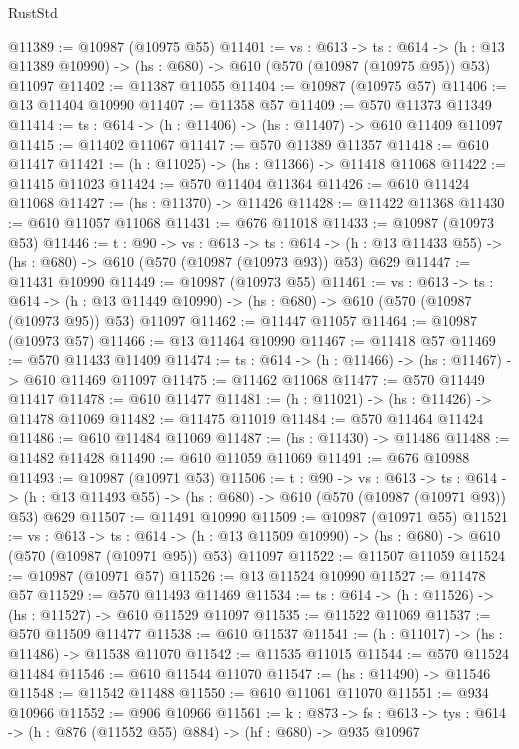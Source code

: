 \begin{lexlean}{RustStd}
\begin{coremodule}
@11389 := @10987 (@10975 @55)
@11401 := {vs : @613} ->
  {ts : @614} ->
  (h : @13 @11389 @10990) -> (hs : @680) -> @610 (@570 (@10987 (@10975 @95)) @53) @11097
@11402 := @11387 @11055
@11404 := @10987 (@10975 @57)
@11406 := @13 @11404 @10990
@11407 := @11358 @57
@11409 := @570 @11373 @11349
@11414 := {ts : @614} -> (h : @11406) -> (hs : @11407) -> @610 @11409 @11097
@11415 := @11402 @11067
@11417 := @570 @11389 @11357
@11418 := @610 @11417
@11421 := (h : @11025) -> (hs : @11366) -> @11418 @11068
@11422 := @11415 @11023
@11424 := @570 @11404 @11364
@11426 := @610 @11424 @11068
@11427 := (hs : @11370) -> @11426
@11428 := @11422 @11368
@11430 := @610 @11057 @11068
@11431 := @676 @11018
@11433 := @10987 (@10973 @53)
@11446 := {t : @90} ->
  {vs : @613} ->
  {ts : @614} -> (h : @13 @11433 @55) -> (hs : @680) -> @610 (@570 (@10987 (@10973 @93)) @53) @629
@11447 := @11431 @10990
@11449 := @10987 (@10973 @55)
@11461 := {vs : @613} ->
  {ts : @614} ->
  (h : @13 @11449 @10990) -> (hs : @680) -> @610 (@570 (@10987 (@10973 @95)) @53) @11097
@11462 := @11447 @11057
@11464 := @10987 (@10973 @57)
@11466 := @13 @11464 @10990
@11467 := @11418 @57
@11469 := @570 @11433 @11409
@11474 := {ts : @614} -> (h : @11466) -> (hs : @11467) -> @610 @11469 @11097
@11475 := @11462 @11068
@11477 := @570 @11449 @11417
@11478 := @610 @11477
@11481 := (h : @11021) -> (hs : @11426) -> @11478 @11069
@11482 := @11475 @11019
@11484 := @570 @11464 @11424
@11486 := @610 @11484 @11069
@11487 := (hs : @11430) -> @11486
@11488 := @11482 @11428
@11490 := @610 @11059 @11069
@11491 := @676 @10988
@11493 := @10987 (@10971 @53)
@11506 := {t : @90} ->
  {vs : @613} ->
  {ts : @614} -> (h : @13 @11493 @55) -> (hs : @680) -> @610 (@570 (@10987 (@10971 @93)) @53) @629
@11507 := @11491 @10990
@11509 := @10987 (@10971 @55)
@11521 := {vs : @613} ->
  {ts : @614} ->
  (h : @13 @11509 @10990) -> (hs : @680) -> @610 (@570 (@10987 (@10971 @95)) @53) @11097
@11522 := @11507 @11059
@11524 := @10987 (@10971 @57)
@11526 := @13 @11524 @10990
@11527 := @11478 @57
@11529 := @570 @11493 @11469
@11534 := {ts : @614} -> (h : @11526) -> (hs : @11527) -> @610 @11529 @11097
@11535 := @11522 @11069
@11537 := @570 @11509 @11477
@11538 := @610 @11537
@11541 := (h : @11017) -> (hs : @11486) -> @11538 @11070
@11542 := @11535 @11015
@11544 := @570 @11524 @11484
@11546 := @610 @11544 @11070
@11547 := (hs : @11490) -> @11546
@11548 := @11542 @11488
@11550 := @610 @11061 @11070
@11551 := @934 @10966
@11552 := @906 @10966
@11561 := {k : @873} ->
  {fs : @613} -> {tys : @614} -> (h : @876 (@11552 @55) @884) -> (hf : @680) -> @935 @10967

\end{coremodule}
\end{lexlean}
